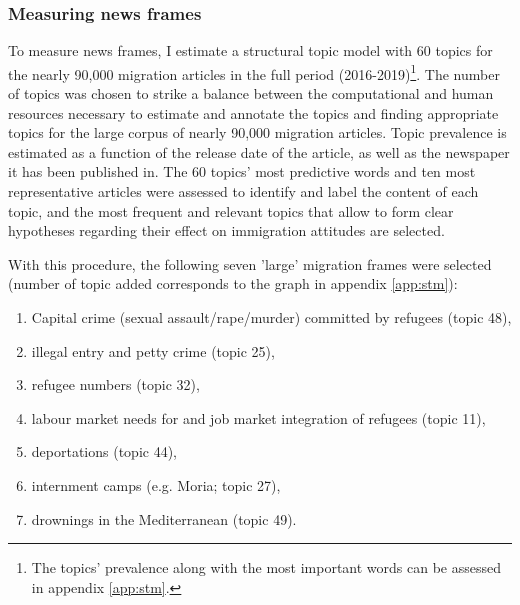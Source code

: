 \documentclass{article}
\begin{document}
\subsubsection{Measuring news frames}\label{sec:frame_selection}

To measure news frames, I estimate a structural topic model with 60 topics for the nearly 90,000 migration articles in the full period (2016-2019)\footnote{The topics' prevalence along with the most important words can be assessed in appendix \ref{app:stm}.}. The number of topics was chosen to strike a balance between the computational and human resources necessary to estimate and annotate the topics and finding appropriate topics for the large corpus of nearly 90,000 migration articles. Topic prevalence is estimated as a function of the release date of the article, as well as the newspaper it has been published in. The 60 topics' most predictive words and ten most representative articles were assessed to identify and label the content of each topic, and the most frequent and relevant topics that allow to form clear hypotheses regarding their effect on immigration attitudes are selected. 

With this procedure, the following seven 'large' migration frames were selected (number of topic added corresponds to the graph in appendix \ref{app:stm}):

\begin{enumerate}
    \item Capital crime (sexual assault/rape/murder) committed by refugees (topic 48), 
    \item illegal entry and petty crime (topic 25),
    \item refugee numbers (topic 32),
    \item labour market needs for and job market integration of refugees (topic 11),
    \item deportations (topic 44),
    \item internment camps (e.g. Moria; topic 27),
    \item drownings in the Mediterranean (topic 49).
\end{enumerate}
\end{document}
